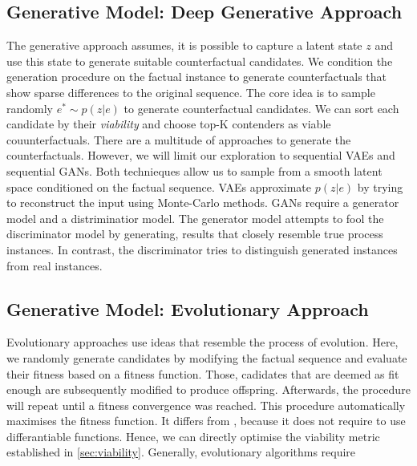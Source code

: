 \documentclass[./../../paper.tex]{subfiles}
\begin{document}
\subsection{Generative Model: Deep Generative Approach}
The generative approach assumes, it is possible to capture a latent state $z$ and use this state to generate suitable counterfactual candidates. We condition the generation procedure on the factual instance to generate counterfactuals that show sparse differences to the original sequence. The core idea is to sample randomly $e^* \sim p(z|e)$ to generate counterfactual candidates. We can sort each candidate by their \emph{viability} and choose top-K contenders as viable couunterfactuals. There are a multitude of approaches to generate the counterfactuals. However, we will limit our exploration to sequential \glspl{VAE} and sequential \glspl{GAN}. Both technieques allow us to sample from a smooth latent space conditioned on the factual sequence. \glspl{VAE} approximate $p(z|e)$ by trying to reconstruct the input using Monte-Carlo methods. \glspl{GAN} require a generator model and a distriminatior model. The generator model attempts to fool the discriminator model by generating, results that closely resemble true process instances. In contrast, the discriminator tries to distinguish generated instances from real instances. 


\subsection{Generative Model: Evolutionary Approach}
Evolutionary approaches use ideas that resemble the process of evolution. Here, we randomly generate candidates by modifying the factual sequence and evaluate their fitness based on a fitness function. Those, cadidates that are deemed as fit enough are subsequently modified to produce offspring. Afterwards, the procedure will repeat until a fitness convergence was reached. This procedure automatically maximises the fitness function. It differs from , because it does not require to use differantiable functions. 
Hence, we can directly optimise the viability metric established in \autoref{sec:viability}. Generally, evolutionary algorithms require 
\end{document}
